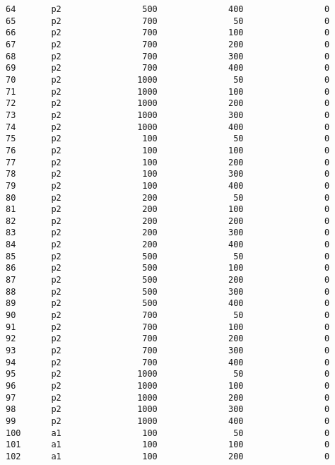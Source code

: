 \documentclass[11pt]{article}
\begin{document}
\begin{Verbatim}[commandchars=\\\{\}]
64       p2                500              400                0   
65       p2                700               50                0   
66       p2                700              100                0   
67       p2                700              200                0   
68       p2                700              300                0   
69       p2                700              400                0   
70       p2               1000               50                0   
71       p2               1000              100                0   
72       p2               1000              200                0   
73       p2               1000              300                0   
74       p2               1000              400                0   
75       p2                100               50                0   
76       p2                100              100                0   
77       p2                100              200                0   
78       p2                100              300                0   
79       p2                100              400                0   
80       p2                200               50                0   
81       p2                200              100                0   
82       p2                200              200                0   
83       p2                200              300                0   
84       p2                200              400                0   
85       p2                500               50                0   
86       p2                500              100                0   
87       p2                500              200                0   
88       p2                500              300                0   
89       p2                500              400                0   
90       p2                700               50                0   
91       p2                700              100                0   
92       p2                700              200                0   
93       p2                700              300                0   
94       p2                700              400                0   
95       p2               1000               50                0   
96       p2               1000              100                0   
97       p2               1000              200                0   
98       p2               1000              300                0   
99       p2               1000              400                0   
100      a1                100               50                0   
101      a1                100              100                0   
102      a1                100              200                0   

\end{Verbatim}
\end{document}
